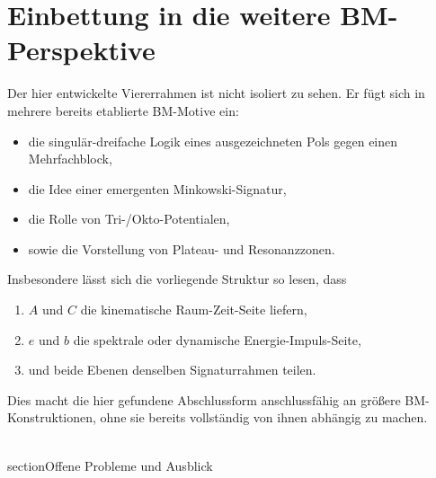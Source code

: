 \documentclass[11pt,a4paper]{article}
\theoremstyle{definition}
\theoremstyle{plain}
\begin{document}
	\section{Einbettung in die weitere BM-Perspektive}
	
	Der hier entwickelte Viererrahmen ist nicht isoliert zu sehen. Er fügt sich in mehrere bereits etablierte BM-Motive ein:
	\begin{itemize}[leftmargin=2em]
		\item die singulär-dreifache Logik eines ausgezeichneten Pols gegen einen Mehrfachblock,
		\item die Idee einer emergenten Minkowski-Signatur,
		\item die Rolle von Tri-/Okto-Potentialen,
		\item sowie die Vorstellung von Plateau- und Resonanzzonen.
	\end{itemize}
	
	Insbesondere lässt sich die vorliegende Struktur so lesen, dass
	\begin{enumerate}[leftmargin=2em]
		\item $A$ und $C$ die kinematische Raum-Zeit-Seite liefern,
		\item $e$ und $b$ die spektrale oder dynamische Energie-Impuls-Seite,
		\item und beide Ebenen denselben Signaturrahmen teilen.
	\end{enumerate}
	
	Dies macht die hier gefundene Abschlussform anschlussfähig an größere BM-Konstruktionen, ohne sie bereits vollständig von ihnen abhängig zu machen.
	
	\\section{Offene Probleme und Ausblick}
	
\end{document}
